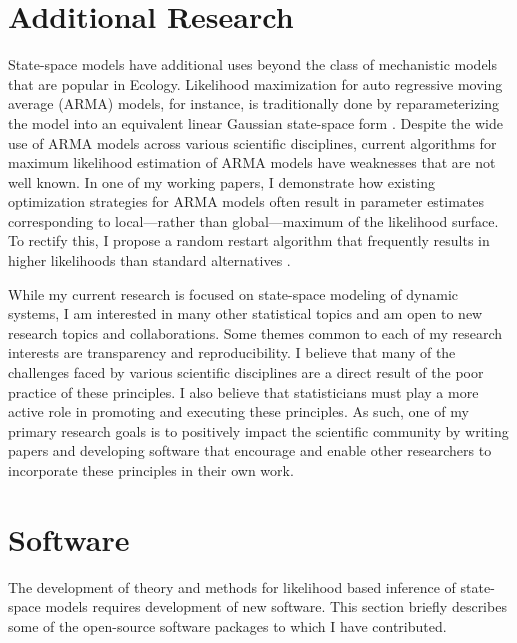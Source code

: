 \documentclass{article}
\begin{document}
\section{Additional Research}

State-space models have additional uses beyond the class of mechanistic models that are popular in Ecology.
Likelihood maximization for auto regressive moving average (ARMA) models, for instance, is traditionally done by reparameterizing the model into an equivalent linear Gaussian state-space form \cite{gardner80, durbin12}.
Despite the wide use of ARMA models across various scientific disciplines, current algorithms for maximum likelihood estimation of ARMA models have weaknesses that are not well known.
In one of my working papers, I demonstrate how existing optimization strategies for ARMA models often result in parameter estimates corresponding to local---rather than global---maximum of the likelihood surface.
To rectify this, I propose a random restart algorithm that frequently results in higher likelihoods than standard alternatives \cite{wheelerARMA}.

While my current research is focused on state-space modeling of dynamic systems, I am interested in many other statistical topics and am open to new research topics and collaborations.
Some themes common to each of my research interests are transparency and reproducibility.
I believe that many of the challenges faced by various scientific disciplines are a direct result of the poor practice of these principles.
I also believe that statisticians must play a more active role in promoting and executing these principles.
As such, one of my primary research goals is to positively impact the scientific community by writing papers and developing software that encourage and enable other researchers to incorporate these principles in their own work.

\section{Software}\label{sec:software}

The development of theory and methods for likelihood based inference of state-space models requires development of new software.
This section briefly describes some of the open-source software packages to which I have contributed.
\end{document}
